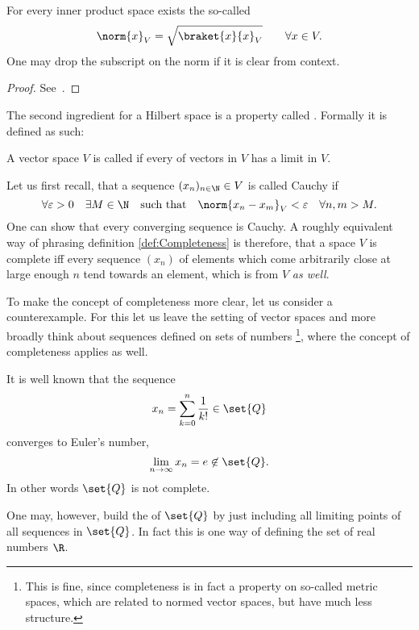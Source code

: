 \begin{prop}
	For every inner product space exists the so-called 
	\begin{equation}
		\norm{x}_V = \sqrt{ \braket{x}{x}_V } \qquad \forall x \in V.
		\label{eqn:normInduced}
	\end{equation}
	One may drop the subscript on the norm
	if it is clear from context.
	\begin{proof}
		See~\cite{DiracNotation}.
	\end{proof}
\end{prop}

The second ingredient for a Hilbert space is a property
called . Formally it is defined as such:
\begin{defn}
	\label{def:Completeness}
	A vector space $V$ is called  if every
	 of vectors in $V$ has a limit in $V$.
\end{defn}
Let us first recall, that a sequence $(x_n)_{n\in\N} \in V$ is called Cauchy if
\[ \forall \varepsilon > 0 \quad
	\exists M \in \N \quad \text{such that} \quad
	\norm{x_n - x_m}_V < \varepsilon \quad \forall n,m > M.
\]
One can show that every converging sequence is Cauchy.
A roughly equivalent way of phrasing definition \vref{def:Completeness}
is therefore,
that a space $V$ is complete iff every sequence $(x_n)$
of elements which come arbitrarily close at large enough $n$
tend towards an element, which is from $V$ \emph{as well}.

\begin{exmp}
	\label{exmp:QdenseR}
	To make the concept of completeness more clear,
	let us consider a counterexample.
	For this let us leave the setting of vector spaces
	and more broadly think about sequences defined on sets of numbers%
	\footnote{This is fine, since completeness is in fact a property on
		so-called metric spaces, which are related to normed vector
		spaces, but have much less structure.},
	where the concept of completeness applies as well.

	\noindent
	It is well known that the sequence
	\[ x_n = \sum_{k=0}^n \frac{1}{k!} \in \set{Q} \]
	converges to Euler's number, \ie
	\[ \lim_{n\to\infty} x_n = e \not\in \set{Q}. \]
	In other words $\set{Q}$ is not complete.

	One may, however, build the  of $\set{Q}$
	by just including all limiting points of all sequences in $\set{Q}$.
	In fact this is one way of defining the set of real numbers $\R$.
\end{exmp}

